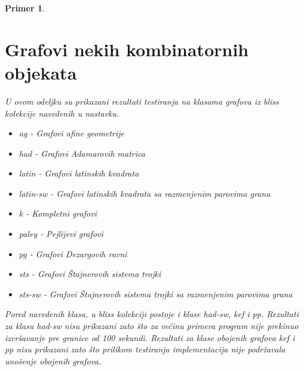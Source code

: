 \documentclass[12pt,oneside]{memoir}
\newtheorem{example}{Primer}
\theoremstyle{definition}
\begin{document}
\begin{example}
\begin{figure}[!h]
	\end{figure}

  \section{Grafovi nekih kombinatornih objekata}

	U ovom odeljku su prikazani rezultati testiranja na klasama grafova iz
	\emph{bliss} kolekcije navedenih u nastavku.
	\begin{itemize}
		\item \emph{ag} - Grafovi afine geometrije
		\item \emph{had} - Grafovi Adamarovih matrica
		\item \emph{latin} - Grafovi latinskih kvadrata
		\item \emph{latin-sw} - Grafovi latinskih kvadrata sa razmenjenim parovima grana
		\item \emph{k} - Kompletni grafovi
		\item \emph{paley} - Pejlijevi grafovi
		\item \emph{pg} - Grafovi Dezargovih ravni
		\item \emph{sts} - Grafovi Štajnerovih sistema trojki
		\item \emph{sts-sw} - Grafovi Štajnerovih sistema trojki sa razmenjenim parovima grana
	\end{itemize}
	Pored navedenih klasa, u \emph{bliss} kolekciji postoje i klase
	\emph{had-sw}, \emph{kef} i \emph{pp}. Rezultati za klasu \emph{had-sw}
	nisu prikazani zato što za većinu primera program nije prekinuo izvršavanje
	pre granice od 100 sekundi. Rezultati za klase obojenih grafova \emph{kef}
	i \emph{pp} nisu prikazani zato što prilikom testiranja implementacija nije
	podržavala unošenje obojenih grafova.

	\pagebreak


\end{example}
\end{document}
